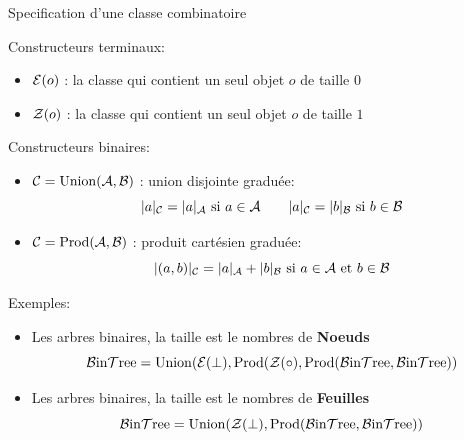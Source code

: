 \documentclass{beamer}
\begin{document}
\begin{frame}{Specification d'une classe combinatoire}
\begin{NOTE}
  Constructeurs terminaux:
  \begin{itemize}
  \item $\mathcal{E}(o)$ : la classe qui contient un seul objet $o$ de taille $0$
  \item $\mathcal{Z}(o)$ : la classe qui contient un seul objet $o$ de taille $1$
  \end{itemize}
  Constructeurs binaires:
  \begin{itemize}
  \item $\mathcal{C} = \operatorname{Union}(\mathcal{A}, \mathcal{B})$ : union disjointe graduée:
    \[|a|_\mC = |a|_\mA\ \text{si $a\in\mA$}\qquad
      |a|_\mC = |b|_\mB\ \text{si $b\in\mB$}\]
  \item $\mathcal{C} = \operatorname{Prod}(\mathcal{A}, \mathcal{B})$ : produit cartésien graduée:
    \[|(a, b)|_{\mathcal{C}} = |a|_{\mathcal{A}} + |b|_{\mathcal{B}}\ \text{si $a\in\mathcal{A}$ et $b\in\mathcal{B}$}\]
  \end{itemize}
\end{NOTE}
\end{frame}

\begin{frame}{Exemples:}

  \begin{itemize}
  \item Les arbres binaires, la taille est le nombres de \textbf{Noeuds}
    \[
    \operatorname{\mathcal{B}in\mathcal{T}ree} = \operatorname{Union}(\mathcal{E}(\bot), \operatorname{Prod}(\mathcal{Z}(\circ), \operatorname{Prod}(\operatorname{\mathcal{B}in\mathcal{T}ree}, \operatorname{\mathcal{B}in\mathcal{T}ree}))
    \]
  \item Les arbres binaires, la taille est le nombres de \textbf{Feuilles}
    \[
    \operatorname{\mathcal{B}in\mathcal{T}ree} = \operatorname{Union}(\mathcal{Z}(\bot), \operatorname{Prod}(\operatorname{\mathcal{B}in\mathcal{T}ree}, \operatorname{\mathcal{B}in\mathcal{T}ree}))
    \]
  \end{itemize}
\end{frame}
\end{document}
